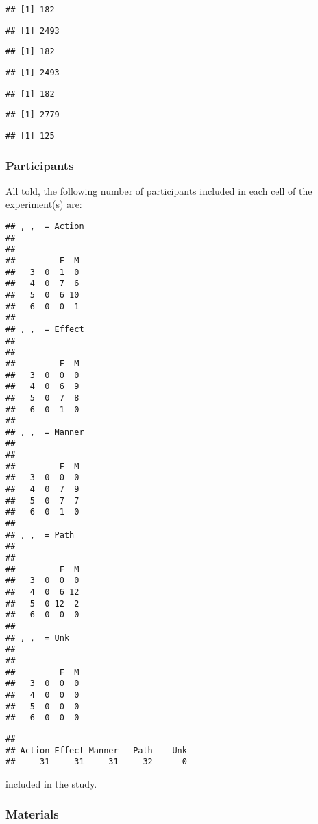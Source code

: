 \documentclass[english,man]{apa6}
\theoremstyle{definition}
\theoremstyle{definition}
\theoremstyle{remark}
\begin{document}
\begin{verbatim}
## [1] 182
\end{verbatim}

\begin{verbatim}
## [1] 2493
\end{verbatim}

\begin{verbatim}
## [1] 182
\end{verbatim}

\begin{verbatim}
## [1] 2493
\end{verbatim}

\begin{verbatim}
## [1] 182
\end{verbatim}

\begin{verbatim}
## [1] 2779
\end{verbatim}

\begin{verbatim}
## [1] 125
\end{verbatim}

\subsubsection{Participants}\label{participants-1}

All told, the following number of participants included in each cell of
the experiment(s) are:

\begin{verbatim}
## , ,  = Action
## 
##    
##         F  M
##   3  0  1  0
##   4  0  7  6
##   5  0  6 10
##   6  0  0  1
## 
## , ,  = Effect
## 
##    
##         F  M
##   3  0  0  0
##   4  0  6  9
##   5  0  7  8
##   6  0  1  0
## 
## , ,  = Manner
## 
##    
##         F  M
##   3  0  0  0
##   4  0  7  9
##   5  0  7  7
##   6  0  1  0
## 
## , ,  = Path
## 
##    
##         F  M
##   3  0  0  0
##   4  0  6 12
##   5  0 12  2
##   6  0  0  0
## 
## , ,  = Unk
## 
##    
##         F  M
##   3  0  0  0
##   4  0  0  0
##   5  0  0  0
##   6  0  0  0
\end{verbatim}

\begin{verbatim}
## 
## Action Effect Manner   Path    Unk 
##     31     31     31     32      0
\end{verbatim}

included in the study.

\subsubsection{Materials}\label{materials}
\end{document}
